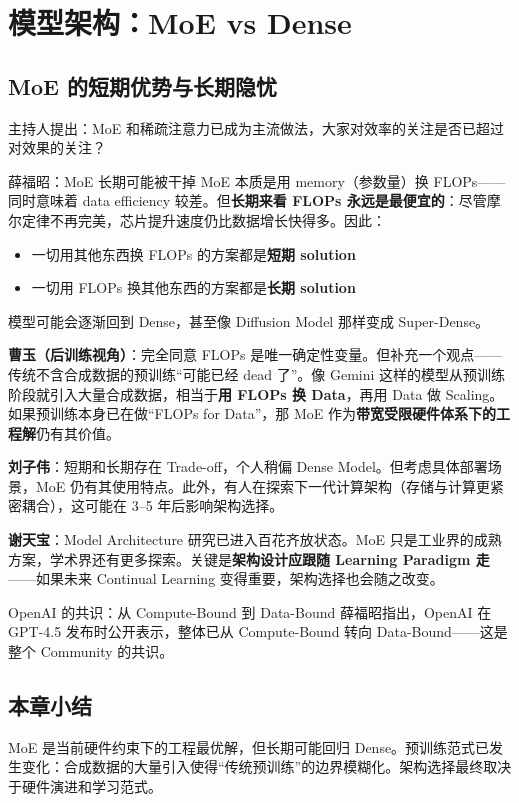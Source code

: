 \section{模型架构：MoE vs Dense}

\subsection{MoE 的短期优势与长期隐忧}

主持人提出：MoE 和稀疏注意力已成为主流做法，大家对效率的关注是否已超过对效果的关注？

\begin{importantbox}{薛福昭：MoE 长期可能被干掉}
MoE 本质是用 memory（参数量）换 FLOPs——同时意味着 data efficiency 较差。但\textbf{长期来看 FLOPs 永远是最便宜的}：尽管摩尔定律不再完美，芯片提升速度仍比数据增长快得多。因此：
\begin{itemize}
  \item 一切用其他东西换 FLOPs 的方案都是\textbf{短期 solution}
  \item 一切用 FLOPs 换其他东西的方案都是\textbf{长期 solution}
\end{itemize}
模型可能会逐渐回到 Dense，甚至像 Diffusion Model 那样变成 Super-Dense。
\end{importantbox}

\textbf{曹玉（后训练视角）}：完全同意 FLOPs 是唯一确定性变量。但补充一个观点——传统不含合成数据的预训练``可能已经 dead 了''。像 Gemini 这样的模型从预训练阶段就引入大量合成数据，相当于\textbf{用 FLOPs 换 Data}，再用 Data 做 Scaling。如果预训练本身已在做``FLOPs for Data''，那 MoE 作为\textbf{带宽受限硬件体系下的工程解}仍有其价值。

\textbf{刘子伟}：短期和长期存在 Trade-off，个人稍偏 Dense Model。但考虑具体部署场景，MoE 仍有其使用特点。此外，有人在探索下一代计算架构（存储与计算更紧密耦合），这可能在 3--5 年后影响架构选择。

\textbf{谢天宝}：Model Architecture 研究已进入百花齐放状态。MoE 只是工业界的成熟方案，学术界还有更多探索。关键是\textbf{架构设计应跟随 Learning Paradigm 走}——如果未来 Continual Learning 变得重要，架构选择也会随之改变。

\begin{warningbox}{OpenAI 的共识：从 Compute-Bound 到 Data-Bound}
薛福昭指出，OpenAI 在 GPT-4.5 发布时公开表示，整体已从 Compute-Bound 转向 Data-Bound——这是整个 Community 的共识。
\end{warningbox}

\subsection{本章小结}
MoE 是当前硬件约束下的工程最优解，但长期可能回归 Dense。预训练范式已发生变化：合成数据的大量引入使得``传统预训练''的边界模糊化。架构选择最终取决于硬件演进和学习范式。

